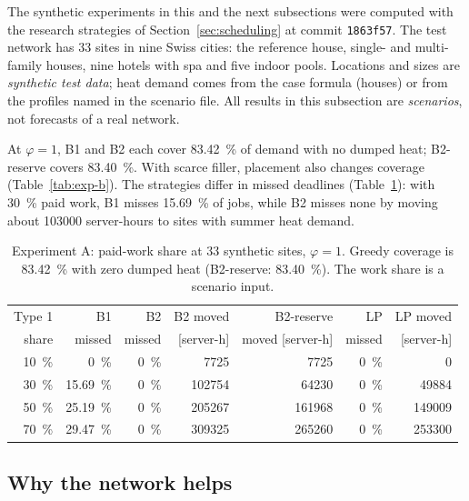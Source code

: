 The synthetic experiments in this and the next subsections were computed with the research
strategies of Section~\ref{sec:scheduling} at commit \texttt{1863f57}. The test network has 33 sites
in nine Swiss cities:
the reference house, single- and multi-family houses, nine hotels with spa and five indoor pools.
Locations and sizes are \emph{synthetic test data}; heat demand comes from the case formula
(houses) or from the profiles named in the scenario file. All results in this subsection are
\emph{scenarios}, not forecasts of a real network.

At $\varphi=1$, B1 and B2 each cover \qty{83.42}{\percent} of demand with no dumped heat;
B2-reserve covers \qty{83.40}{\percent}. With scarce filler, placement also changes coverage
(Table~\ref{tab:exp-b}). The strategies
differ in missed deadlines (Table~\ref{tab:exp-a}): with \qty{30}{\percent} paid work, B1 misses
\qty{15.69}{\percent} of jobs, while B2 misses none by moving about \num{103000} server-hours to
sites with summer heat demand.

\begin{table}[ht]
  \centering
  \caption{Experiment A: paid-work share at 33 synthetic sites, $\varphi=1$.
    Greedy coverage is \qty{83.42}{\percent} with zero dumped heat
    (B2-reserve: \qty{83.40}{\percent}). The work share is a scenario input.}
  \label{tab:exp-a}
  \small
  \begin{tabular}{rrrrrrr}
    \toprule
    Type 1 & B1 & B2 & B2 moved & B2-reserve & LP & LP moved \\
    share & missed & missed & [server-h] & moved [server-h] & missed & [server-h] \\
    \midrule
    \qty{10}{\percent} & \qty{0}{\percent} & \qty{0}{\percent} & \num{7725} & \num{7725} & \qty{0}{\percent} & \num{0} \\
    \qty{30}{\percent} & \qty{15.69}{\percent} & \qty{0}{\percent} & \num{102754} & \num{64230} & \qty{0}{\percent} & \num{49884} \\
    \qty{50}{\percent} & \qty{25.19}{\percent} & \qty{0}{\percent} & \num{205267} & \num{161968} & \qty{0}{\percent} & \num{149009} \\
    \qty{70}{\percent} & \qty{29.47}{\percent} & \qty{0}{\percent} & \num{309325} & \num{265260} & \qty{0}{\percent} & \num{253300} \\
    \bottomrule
  \end{tabular}
\end{table}

\subsection{Why the network helps}
\label{sec:eval-why}

